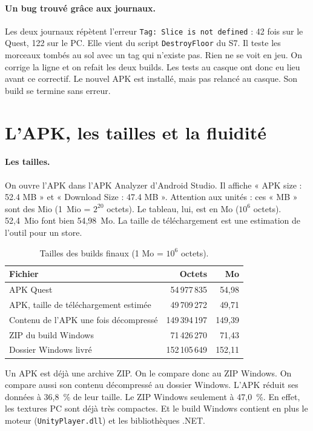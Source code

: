 \documentclass[11pt,a4paper]{article}
\begin{document}
\paragraph{Un bug trouvé grâce aux journaux.} Les deux journaux répètent l'erreur \texttt{Tag: Slice is
not defined} : 42 fois sur le Quest, 122 sur le PC. Elle vient du script \texttt{DestroyFloor} du S7.
Il teste les morceaux tombés au sol avec un tag qui n'existe pas. Rien ne se voit en jeu. On corrige
la ligne et on refait les deux builds. Les tests au casque ont donc eu lieu avant ce correctif. Le
nouvel APK est installé, mais pas relancé au casque. Son build se termine sans erreur.

\section{L'APK, les tailles et la fluidité}

\paragraph{Les tailles.} On ouvre l'APK dans l'APK Analyzer d'Android Studio. Il affiche
« APK size : 52.4 MB » et « Download Size : 47.4 MB ». Attention aux unités : ces « MB » sont des Mio
(1~Mio = $2^{20}$ octets). Le tableau, lui, est en Mo ($10^6$ octets). 52,4~Mio font bien 54,98~Mo. La
taille de téléchargement est une estimation de l'outil pour un store.

\begin{table}[!htb]
\centering\small
\caption{Tailles des builds finaux (1 Mo = $10^6$ octets).}
\begin{tabularx}{\textwidth}{@{}Lrr@{}}
\toprule
Fichier & Octets & Mo \\
\midrule
APK Quest & 54\,977\,835 & 54,98 \\
APK, taille de téléchargement estimée & 49\,709\,272 & 49,71 \\
Contenu de l'APK une fois décompressé & 149\,394\,197 & 149,39 \\
ZIP du build Windows & 71\,426\,270 & 71,43 \\
Dossier Windows livré & 152\,105\,649 & 152,11 \\
\bottomrule
\end{tabularx}
\end{table}

Un APK est déjà une archive ZIP. On le compare donc au ZIP Windows. On compare aussi son contenu
décompressé au dossier Windows. L'APK réduit ses données à 36,8~\% de leur taille. Le ZIP Windows
seulement à 47,0~\%. En effet, les textures PC sont déjà très compactes. Et le build Windows contient
en plus le moteur (\texttt{UnityPlayer.dll}) et les bibliothèques .NET.
\end{document}
